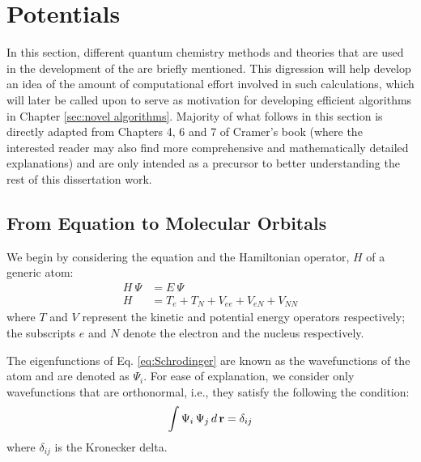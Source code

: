     \section{\Abinitio{} Potentials}
        In this section, different quantum chemistry methods and theories that are used in the development of the \abinitio{} \PESs{} are briefly mentioned. This digression will help develop an idea of the amount of computational effort involved in such calculations, which will later be called upon to serve as motivation for developing efficient algorithms in Chapter \ref{sec:novel algorithms}. Majority of what follows in this section is directly adapted from Chapters 4, 6 and 7 of Cramer's book \cite{Cramer} (where the interested reader may also find more comprehensive and mathematically detailed explanations) and are only intended as a precursor to better understanding the rest of this dissertation work. \\
        \subsection{From \Schrodinger{} Equation to Molecular Orbitals}
            We begin by considering the \Schrodinger{} equation and the Hamiltonian operator, $H$ of a generic atom:
            \begin{equation}\label{eq:Schrodinger}
                \begin{aligned}
                    H~\Psi &= E~\Psi \\
                    H &= T_e + T_N + V_{ee} + V_{eN} + V_{NN}
                \end{aligned}
            \end{equation}
            where $T$ and $V$ represent the kinetic and potential energy operators respectively; the subscripts $e$ and $N$ denote the electron and the nucleus respectively.

            The eigenfunctions of Eq. \eqref{eq:Schrodinger} are known as the wavefunctions of the atom and are denoted as $\Psi_i$. For ease of explanation, we consider only wavefunctions that are orthonormal, i.e., they satisfy the following the condition:
            \begin{equation}\label{eq:orthonormality}
                \int \Psi_i\, \Psi_j\, d\, {\mathbf {r}} = \delta_{ij}
            \end{equation}
            where $\delta_{ij}$ is the Kronecker delta.

